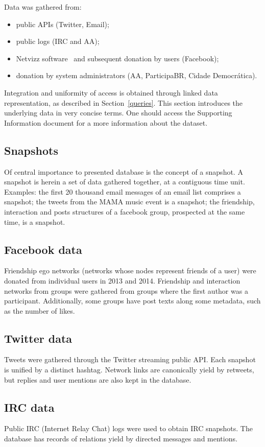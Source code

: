 \documentclass[journal,article,submit,moreauthors,pdftex]{Definitions/mdpi}
\begin{document}
Data was gathered from:
\begin{itemize}
    \item public APIs (Twitter, Email);
    \item public logs (IRC and AA);
    \item Netvizz software~\cite{netvizz} and subsequent donation by users (Facebook);
    \item donation by system administrators (AA, ParticipaBR, Cidade Democr\'atica).
\end{itemize}

Integration and uniformity of access is obtained through linked data
representation, as described in Section~\ref{queries}.
This section introduces the underlying data in very concise terms.
One should access the Supporting Information document for
a more information about the dataset.

\subsection{Snapshots}
Of central importance to presented database is the concept of a snapshot.
A snapshot is herein a set of data gathered together, at a contiguous time
unit.
Examples: the first 20 thousand email messages of an email list
comprises a snapshot; the tweets from the MAMA music event is a
snapshot; the friendship, interaction and posts structures of a facebook
group, prospected at the same time, is a snapshot.

\subsection{Facebook data}
Friendship ego networks (networks whose nodes represent friends of a user)
were donated from individual users in 2013 and 2014.
Friendship and interaction networks from groups were gathered from
groups where the first author was a participant.
Additionally, some groups have post texts along some metadata, such as
the number of likes.

\subsection{Twitter data}
Tweets were gathered through the Twitter streaming public API.
Each snapshot is unified by a distinct hashtag.
Network links are canonically yield by retweets,
but replies and user mentions are also kept in the database.

\subsection{IRC data}
Public IRC (Internet Relay Chat) logs were used to obtain IRC snapshots.
The database has records of relations yield by directed messages and
mentions.
\end{document}
